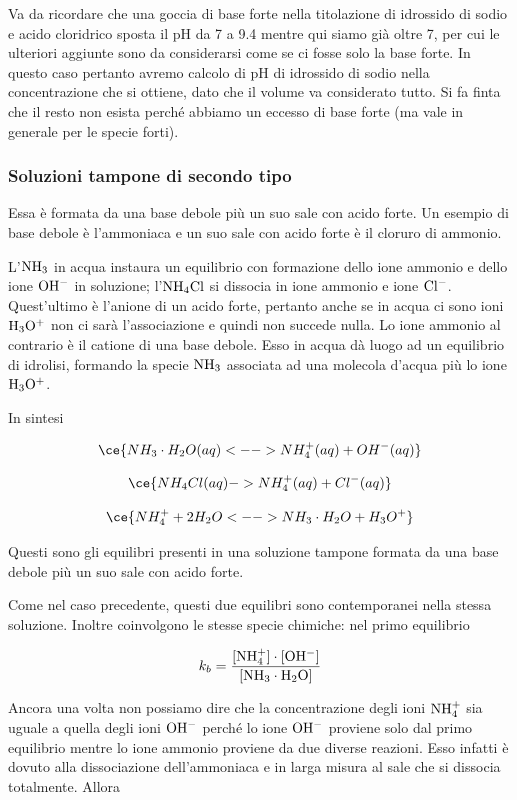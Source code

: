 Va da ricordare che una goccia di base forte nella titolazione di idrossido di sodio e acido cloridrico sposta il pH da 7 a 9.4 mentre qui siamo già oltre 7, per cui le ulteriori aggiunte sono da considerarsi come se ci fosse solo la base forte. In questo caso pertanto avremo calcolo di pH di idrossido di sodio nella concentrazione che si ottiene, dato che il volume va considerato tutto. Si fa finta che il resto non esista perché abbiamo un eccesso di base forte (ma vale in generale per le specie forti).

\subsubsection{Soluzioni tampone di secondo tipo}
Essa è formata da una base debole più un suo sale con acido forte. Un esempio di base debole è l'ammoniaca e un suo sale con acido forte è il cloruro di ammonio.

L'$\rm NH_3$ in acqua instaura un equilibrio con formazione dello ione ammonio e dello ione $\rm OH^-$ in soluzione; l'$\rm NH_4Cl$ si dissocia in ione ammonio e ione $\rm Cl^-$. Quest'ultimo è l'anione di un acido forte, pertanto anche se in acqua ci sono ioni $\rm H_3O^+$ non ci sarà l'associazione e quindi non succede nulla. Lo ione ammonio al contrario è il catione di una base debole. Esso in acqua dà luogo ad un equilibrio di idrolisi, formando la specie $\rm NH_3$ associata ad una molecola d'acqua più lo ione $\rm H_3O^+$.

In sintesi

$$\ce{NH_3 \cdot H_2O(aq) <--> NH_4^+(aq) + OH^-(aq)}$$

$$\ce{NH_4Cl(aq) -> NH_4^+(aq) + Cl^-(aq)}$$

$$\ce{NH_4^+ + 2H_2O <--> NH_3 \cdot H_2O + H_3O^+}$$

Questi sono gli equilibri presenti in una soluzione tampone formata da una base debole più un suo sale con acido forte.

Come nel caso precedente, questi due equilibri sono contemporanei nella stessa soluzione. Inoltre coinvolgono le stesse specie chimiche: nel primo equilibrio

$$k_b = \rm{\frac{[NH_4^+] \cdot [OH^-]}{[NH_3 \cdot H_2O]}}$$

Ancora una volta non possiamo dire che la concentrazione degli ioni $\rm NH_4^+$ sia uguale a quella degli ioni $\rm OH^-$ perché lo ione $\rm OH^-$ proviene solo dal primo equilibrio mentre lo ione ammonio proviene da due diverse reazioni. Esso infatti è dovuto alla dissociazione dell'ammoniaca e in larga misura al sale che si dissocia totalmente. Allora 

